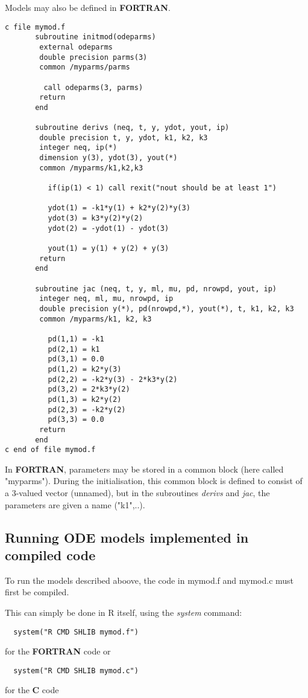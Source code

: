 \documentclass[english]{article}
\newcommand{\FOR}{\textbf{\textsf{FORTRAN}}\xspace}
\newcommand{\C}{\textbf{\textsf{C}}\xspace}
\begin{document}
Models may also be defined in \FOR.
\begin{verbatim}
c file mymod.f
       subroutine initmod(odeparms)
        external odeparms
        double precision parms(3)
        common /myparms/parms

         call odeparms(3, parms)
        return
       end

       subroutine derivs (neq, t, y, ydot, yout, ip)
        double precision t, y, ydot, k1, k2, k3
        integer neq, ip(*)
        dimension y(3), ydot(3), yout(*)
        common /myparms/k1,k2,k3

          if(ip(1) < 1) call rexit("nout should be at least 1")

          ydot(1) = -k1*y(1) + k2*y(2)*y(3)
          ydot(3) = k3*y(2)*y(2)
          ydot(2) = -ydot(1) - ydot(3)

          yout(1) = y(1) + y(2) + y(3)
        return
       end

       subroutine jac (neq, t, y, ml, mu, pd, nrowpd, yout, ip)
        integer neq, ml, mu, nrowpd, ip
        double precision y(*), pd(nrowpd,*), yout(*), t, k1, k2, k3
        common /myparms/k1, k2, k3

          pd(1,1) = -k1
          pd(2,1) = k1
          pd(3,1) = 0.0
          pd(1,2) = k2*y(3)
          pd(2,2) = -k2*y(3) - 2*k3*y(2)
          pd(3,2) = 2*k3*y(2)
          pd(1,3) = k2*y(2)
          pd(2,3) = -k2*y(2)
          pd(3,3) = 0.0
        return
       end
c end of file mymod.f
\end{verbatim}

In \FOR, parameters may be stored in a common block (here called "myparms").
During the initialisation, this common block is defined to consist of a 3-valued vector
(unnamed), but in the subroutines \emph{derivs} and \emph{jac}, the parameters are
given a name ("k1",..).

\subsection{Running ODE models implemented in compiled code}

To run the models described aboove, the code in mymod.f and mymod.c must first be compiled.

This can simply be done in R itself, using the \emph{system} command:
\begin{verbatim}
  system("R CMD SHLIB mymod.f")
\end{verbatim}
for the \FOR code or
\begin{verbatim}
  system("R CMD SHLIB mymod.c")
\end{verbatim}
for the \C code
\end{document}
